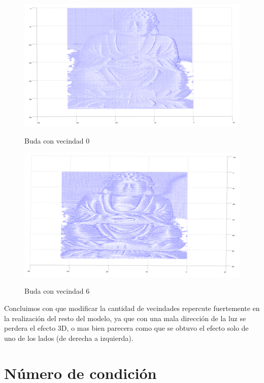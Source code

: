 \begin{figure}[H]
   \includegraphics[scale=0.4]{buda_vecindad_0.png}
   \label{Fig. 2}
   \caption{Buda con vecindad 0}
\end{figure}

\begin{figure}[H]
   \includegraphics[scale=0.4]{buda_vecindades_6.png}
   \label{Fig. 3}
   \caption{Buda con vecindad 6}
\end{figure}



Concluimos con que modificar la cantidad de vecindades repercute fuertemente en la realización del resto del modelo, ya que con una mala dirección de la luz se perdera el efecto 3D, o mas bien parecera como que se obtuvo el efecto solo de uno de los lados (de derecha a izquierda). \par



\section{Número de condición}


